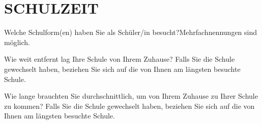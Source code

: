 
\section{\uppercase{Schulzeit}}
\vspace{.25cm}

\begin{choicequestion}[1]{Welche Schulform(en) haben Sie als Schüler/in besucht?\newline\footnotesize{Mehrfachnennungen sind möglich.}}
\end{choicequestion}

\vspace{-.15cm}
\separate
\vspace{-.15cm}

\begin{choicegroup}{Wie weit entfernt lag Ihre Schule von Ihrem Zuhause?
	\newline\footnotesize Falls Sie die Schule gewechselt haben, beziehen Sie sich auf die von Ihnen am längsten besuchte Schule.}

\end{choicegroup}

\vspace{-.15cm}
\separate
\vspace{-.15cm}

\begin{choicegroup}{Wie lange brauchten Sie durchschnittlich, um von Ihrem Zuhause zu Ihrer Schule zu kommen?
	\newline\footnotesize Falls Sie die Schule gewechselt haben, beziehen Sie sich auf die von Ihnen am längsten besuchte Schule.}

\end{choicegroup}

